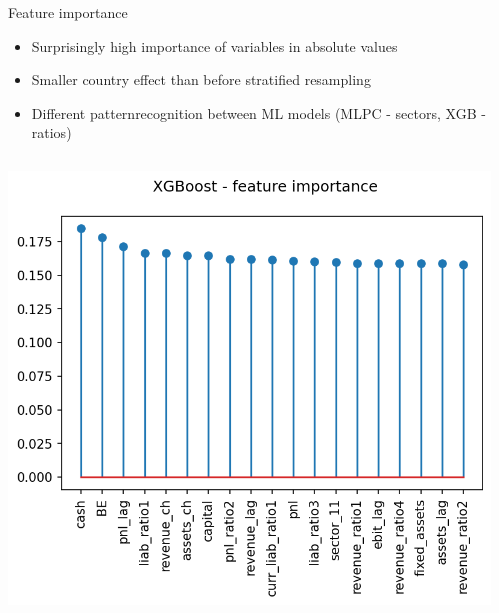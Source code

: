 \documentclass{beamer}
\begin{document}
\begin{frame}{Feature importance}

\begin{itemize}
\item Surprisingly high importance of variables in absolute values
\item Smaller country effect than before stratified resampling
\item Different patternrecognition between ML models (MLPC - sectors, XGB - ratios)
\end{itemize}
\begin{columns} 
\fontsize{9pt}{7.2}\selectfont

    \begin{column}{.5\textwidth}
    \begin{center}
        \includegraphics[scale=0.42]{img/xgb_exp.png}
		\end{center}
    \end{column}
    \begin{column}{.5\textwidth}
        \begin{center}

\end{center}
\end{column}
\end{columns}
\end{frame}
\end{document}
